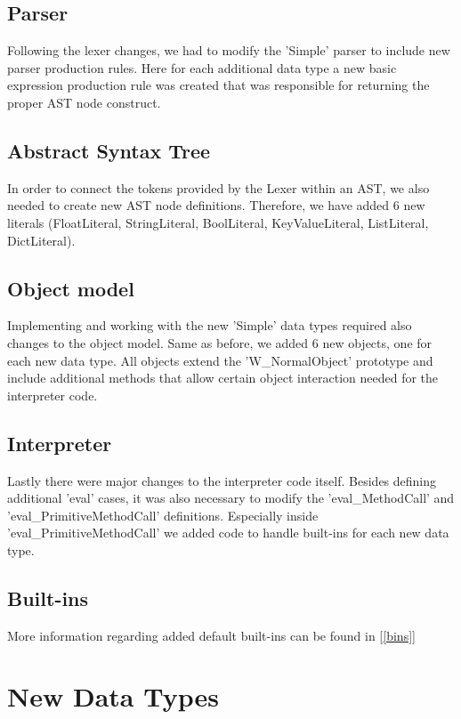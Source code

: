 \documentclass{article}
\begin{document}
\subsection{Parser}
Following the lexer changes, we had to modify the 'Simple' parser to include new parser production rules. Here for each additional data type a new basic expression production rule was created that was responsible for returning the proper AST node construct.

\subsection{Abstract Syntax Tree}
In order to connect the tokens provided by the Lexer within an AST, we also needed to create new AST node definitions. Therefore, we have added 6 new literals (FloatLiteral, StringLiteral, BoolLiteral, KeyValueLiteral, ListLiteral, DictLiteral).

\subsection{Object model}
Implementing and working with the new 'Simple' data types required also changes to the object model. Same as before, we added 6 new objects, one for each new data type. All objects extend the 'W\_NormalObject' prototype and include additional methods that allow certain object interaction needed for the interpreter code.

\subsection{Interpreter}
Lastly there were major changes to the interpreter code itself. Besides defining additional 'eval' cases, it was also necessary to modify the 'eval\_MethodCall' and 'eval\_PrimitiveMethodCall' definitions. Especially inside 'eval\_PrimitiveMethodCall' we added code to handle built-ins for each new data type.


\subsection{Built-ins}
More information regarding added default built-ins can be found in [\ref{bins}]


\section{New Data Types}
\end{document}
